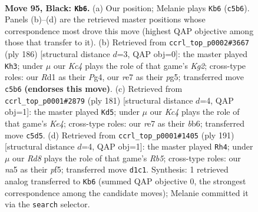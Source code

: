 \documentclass[11pt]{article}
\begin{document}
\clearpage

\begin{figure}[p]\centering
\begin{subfigure}{0.46\textwidth}\centering
\resizebox{\linewidth}{!}{%
\newchessgame
\chessboard[
  setfen={8/4R3/8/N1k2K2/8/8/6P1/3r4 b - - 55 95},
  showmover=false,
  pgfstyle=straightmove, color=movearrow, markmove={c5-b6}
]}
\caption{}
\end{subfigure}\hfill
\begin{subfigure}{0.46\textwidth}\centering
\resizebox{\linewidth}{!}{%
\newchessgame
\chessboard[
  setfen={R7/8/4k3/6p1/2n3P1/8/6K1/8 w - - 45 94},
  showmover=false,
  pgfstyle=straightmove, color=movearrow, markmove={g2-h3}
]}
\caption{}
\end{subfigure}
\\[4pt]
\begin{subfigure}{0.46\textwidth}\centering
\resizebox{\linewidth}{!}{%
\newchessgame
\chessboard[
  setfen={8/6N1/1B6/4k1P1/2r5/6K1/8/8 b - - 12 91},
  showmover=false,
  pgfstyle=straightmove, color=movearrow, markmove={e5-d5}
]}
\caption{}
\end{subfigure}\hfill
\begin{subfigure}{0.46\textwidth}\centering
\resizebox{\linewidth}{!}{%
\newchessgame
\chessboard[
  setfen={8/R7/5p1k/5P2/1r6/5K2/8/8 b - - 5 96},
  showmover=false,
  pgfstyle=straightmove, color=movearrow, markmove={b4-h4}
]}
\caption{}
\end{subfigure}
\caption{\textbf{Move 95, Black: \texttt{Kb6}.} (a) Our position; Melanie plays \texttt{Kb6} (\texttt{c5b6}). Panels (b)--(d) are the retrieved master positions whose correspondence most drove this move (highest QAP objective among those that transfer to it). (b) Retrieved from \texttt{ccrl\_top\_p0002\#3667} (ply 186) [structural distance $d$=3, QAP obj=0]: the master played \texttt{Kh3}; under $\mu$ our \emph{Kc4} plays the role of that game's \emph{Kg2}; cross-type roles: our \emph{R}d1 as their \emph{P}g4, our \emph{r}e7 as their \emph{p}g5; transferred move \texttt{c5b6} \textbf{(endorses this move)}. (c) Retrieved from \texttt{ccrl\_top\_p0001\#2879} (ply 181) [structural distance $d$=4, QAP obj=1]: the master played \texttt{Kd5}; under $\mu$ our \emph{Kc4} plays the role of that game's \emph{Ke4}; cross-type roles: our \emph{r}e7 as their \emph{b}b6; transferred move \texttt{c5d5}. (d) Retrieved from \texttt{ccrl\_top\_p0001\#1405} (ply 191) [structural distance $d$=4, QAP obj=1]: the master played \texttt{Rh4}; under $\mu$ our \emph{Rd8} plays the role of that game's \emph{Rb5}; cross-type roles: our \emph{n}a5 as their \emph{p}f5; transferred move \texttt{d1c1}. Synthesis: 1 retrieved analog transferred to \texttt{Kb6} (summed QAP objective 0, the strongest correspondence among the candidate moves); Melanie committed it via the \texttt{search} selector.}
\label{fig:thought-m189}
\end{figure}
\end{document}
